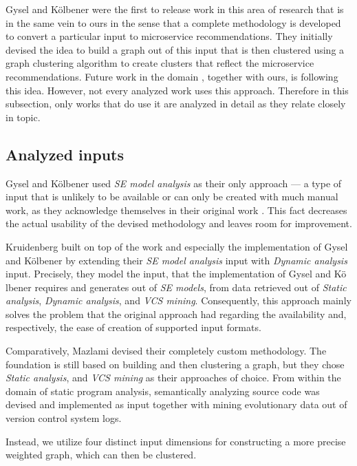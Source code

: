 \documentclass[12pt,a4paper]{report}
\begin{document}
Gysel and K{\"o}lbener \cite{gysel2016service} were the first to release work
in this area of research that is in the same vein to ours in the sense that a
complete methodology is developed to convert a particular input to microservice
recommendations. They initially devised the idea to build a graph out of this
input that is then clustered using a graph clustering algorithm to create
clusters that reflect the microservice recommendations. Future work in the
domain \cite{mazlami2017extraction, kruidenberg2018monoliths}, together with
ours, is following this idea. However, not every analyzed work uses this
approach. Therefore in this subsection, only works that do use it are analyzed
in detail as they relate closely in topic.


\subsection{Analyzed inputs}

Gysel and K{\"o}lbener used \textit{SE model analysis} as their only
approach --- a type of input that is unlikely to be available or can only be
created with much manual work, as they acknowledge themselves in their original
work \cite{gysel2016service}. This fact decreases the actual usability of the
devised methodology and leaves room for improvement.

Kruidenberg \cite{kruidenberg2018monoliths} built on top of the work and
especially the implementation of Gysel and K{\"o}lbener by extending their
\textit{SE model analysis} input with \textit{Dynamic analysis} input.
Precisely, they model the input, that the implementation of Gysel and
K{\"o} lbener requires and generates out of \textit{SE models}, from data retrieved
out of \textit{Static analysis}, \textit{Dynamic analysis}, and \textit{VCS
mining}. Consequently, this approach mainly solves the problem that the
original approach had regarding the availability and, respectively, the ease of
creation of supported input formats.

Comparatively, Mazlami \cite{mazlami2017extraction} devised their completely
custom methodology. The foundation is still based on building and then
clustering a graph, but they chose \textit{Static analysis}, and \textit{VCS
mining} as their approaches of choice. From within the domain of static program
analysis, semantically analyzing source code was devised and implemented as
input together with mining evolutionary data out of version control system
logs.

Instead, we utilize four distinct input dimensions for constructing a more
precise weighted graph, which can then be clustered.
\end{document}
